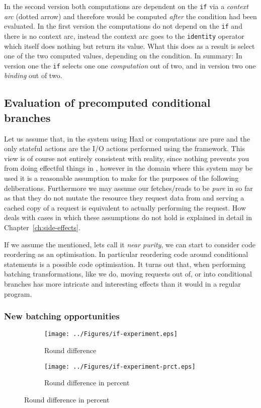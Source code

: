 In the second version both computations are dependent on the \texttt{if} via a \textit{context arc} (dotted arrow) and therefore would be computed \textit{after} the condition had been evaluated.
In the first version the computations do not depend on the \texttt{if} and there is no context arc, instead the context arc goes to the \texttt{identity} operator which itself does nothing but return its value.
What this does as a result is select one of the two computed values, depending on the condition.
In summary: In version one the \texttt{if} selects one one \emph{computation} out of two, and in version two one \emph{binding} out of two.


\subsection{Evaluation of precomputed conditional branches}

\label{sec:precomp-eval}

Let us assume that, in the system using Haxl or \yauhau{} computations are pure and the only stateful actions are the I/O actions performed using the framework.
This view is of course not entirely consistent with reality, since nothing prevents you from doing effectful things in \yauhau{}, however in the domain where this system may be used it is a reasonable assumption to make for the purposes of the following deliberations.
Furthermore we may assume our fetches/reads to be \textit{pure} in so far as that they do not mutate the resource they request data from and serving a cached copy of a request is equivalent to actually performing the request.
How \yauhau{} deals with cases in which these assumptions do not hold is explained in detail in Chapter~\ref{ch:side-effects}.

If we assume the mentioned, lets call it \textit{near purity}, we can start to consider code reordering as an optimisation.
In particular reordering code around conditional statements is a possible code optimisation.
It turns out that, when performing batching transformations, like we do, moving requests out of, or into conditional branches has more intricate and interesting effects than it would in a regular program.

\subsubsection{New batching opportunities}

\begin{figure}[h]
  \begin{subfigure}{\textwidth}
      \texttt{[image: ../Figures/if-experiment.eps]}
      \caption{Round difference}
      \label{fig:if-experiment}
  \end{subfigure}
  \begin{subfigure}{\textwidth}
    \texttt{[image: ../Figures/if-experiment-prct.eps]}
    \caption{Round difference in percent}
    \label{fig:if-experiment-prct}
  \end{subfigure}
\end{figure}

